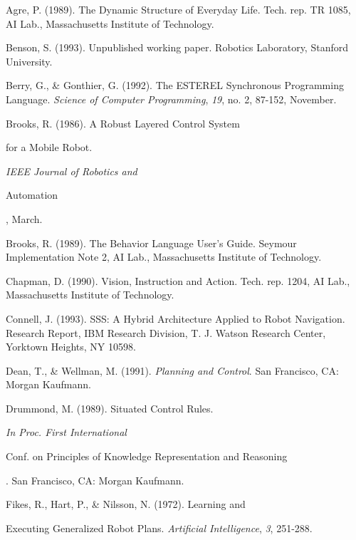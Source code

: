 \begin{thebibliography}{}

Agre, P. (1989). The Dynamic Structure of Everyday Life. Tech. rep. TR 1085,  
AI Lab., Massachusetts Institute of Technology.

Benson, S. (1993). Unpublished working paper. Robotics Laboratory, Stanford  
University.

Berry, G., \& Gonthier, G. (1992). The {\small ESTEREL}  Synchronous  
Programming Language.   {\it Science of Computer Programming}, {\it 19}, no.  
2, 87-152, November.

Brooks, R. (1986). A Robust Layered Control System 

for a Mobile Robot.  {\it IEEE Journal of Robotics and 

Automation}, March.

Brooks, R. (1989). The Behavior Language User's Guide. Seymour Implementation  
Note 2, AI Lab., Massachusetts Institute of Technology. 



Chapman, D. (1990). Vision, Instruction and Action. Tech. rep. 1204, AI Lab.,  
Massachusetts Institute of Technology.

Connell, J. (1993).  SSS:  A Hybrid Architecture Applied to Robot Navigation.  
Research Report, IBM Research Division, T. J. Watson Research Center,  
Yorktown Heights, NY 10598.

Dean, T., \& Wellman, M. (1991).  {\it Planning and Control}. San Francisco,  
CA: Morgan Kaufmann.

Drummond,  M. (1989).  Situated Control Rules.  {\it In Proc. First  
International 

Conf. on Principles of Knowledge Representation and Reasoning}.
San Francisco, CA: Morgan Kaufmann.

Fikes, R., Hart, P., \& Nilsson, N. (1972). Learning and 

Executing Generalized Robot Plans. {\it Artificial Intelligence}, {\it  3},  
251-288.


\end{thebibliography}
